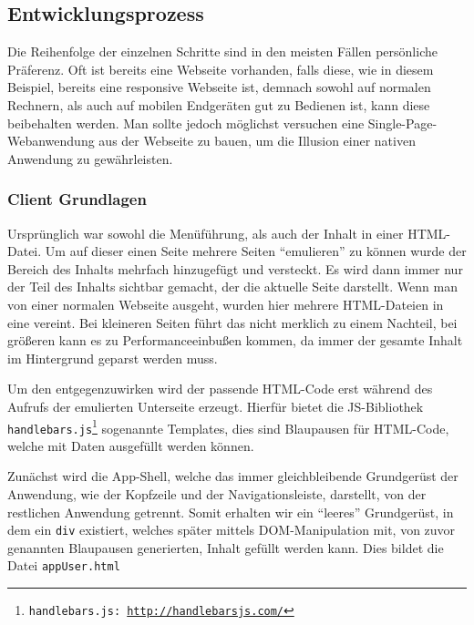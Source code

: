 \documentclass[a4paper,12pt,ngerman,listof=numbered]{scrartcl}      %
\let\oldcite\cite
\renewcommand{\cite}[1]{\textsuperscript{\oldcite{#1}}}
\providecommand{\inlinecode}[1]{\texttt{#1}}
\begin{document}
	\subsection{Entwicklungsprozess}
	Die Reihenfolge der einzelnen Schritte sind in den meisten Fällen persönliche Präferenz. Oft ist bereits eine Webseite vorhanden, falls diese, wie in diesem Beispiel, bereits eine responsive Webseite ist, demnach sowohl auf normalen Rechnern, als auch auf mobilen Endgeräten gut zu Bedienen ist, kann diese beibehalten werden. Man sollte jedoch möglichst versuchen eine Single-Page-Webanwendung\cite{singlePageWiki} aus der Webseite zu bauen, um die Illusion einer nativen Anwendung zu gewährleisten.\par
	
	\subsubsection{Client Grundlagen}
	Ursprünglich war sowohl die Me\-nü\-füh\-rung, als auch der Inhalt in einer HTML-Datei. Um auf dieser einen Seite mehrere Seiten ``emulieren'' zu können wurde der Bereich des Inhalts mehrfach hinzugefügt und versteckt. Es wird dann immer nur der Teil des Inhalts sichtbar gemacht, der die aktuelle Seite darstellt. Wenn man von einer normalen Webseite ausgeht, wurden hier mehrere HTML-Dateien in eine vereint. Bei kleineren Seiten führt das nicht merklich zu einem Nachteil, bei größeren kann es zu Performanceeinbußen kommen, da immer der gesamte Inhalt im Hintergrund geparst werden muss.\par
	Um den entgegenzuwirken wird der passende HTML-Code erst während des Aufrufs der emulierten Unterseite erzeugt. Hierfür bietet die JS-Bibliothek \inlinecode{handle\-bars.js\footnote{\inlinecode{handlebars.js}: \url{http://handlebarsjs.com/}}} sogenannte Templates, dies sind Blaupausen für HTML-Code, welche mit Daten ausgefüllt werden können.\par
	Zunächst wird die App-Shell, welche das immer gleichbleibende Grundgerüst der Anwendung, wie der Kopfzeile und der Navigations\-leiste, darstellt, von der restlichen Anwendung getrennt. Somit erhalten wir ein ``leeres'' Grundgerüst, in dem ein \inlinecode{div} existiert, welches später mittels DOM-Manipulation mit, von zuvor genannten Blaupausen generierten, Inhalt gefüllt werden kann. Dies bildet die Datei \inlinecode{appUser.html}\par
\end{document}
